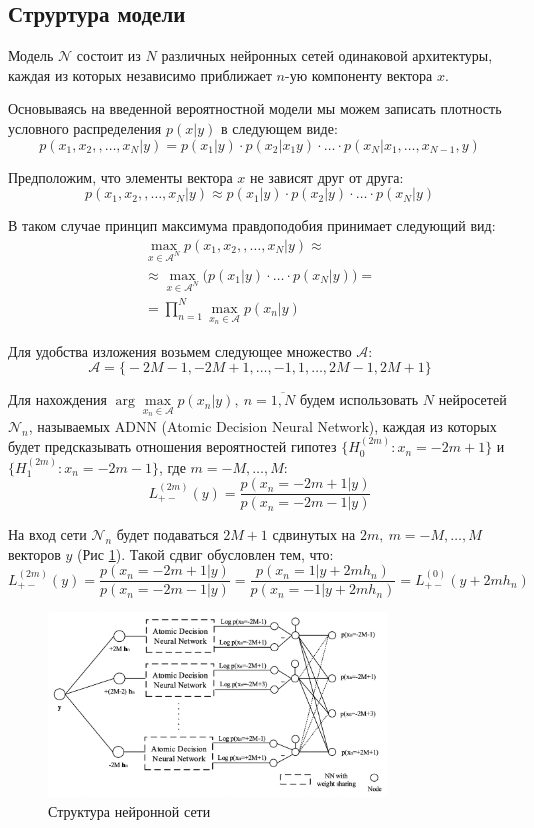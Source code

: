 \documentclass[12pt]{article}
\begin{document}
\subsection{Струртура модели}
Модель $\mathcal{N}$ состоит из $N$ различных нейронных сетей одинаковой архитектуры, каждая из которых независимо приближает $n$-ую компоненту вектора $x$.

Основываясь на введенной вероятностной модели мы можем записать плотность условного распределения $p(x | y)$ в следующем виде:
    $$
    p(x_1, x_2, , \ldots, x_N | y) = p(x_1 | y) \cdot p(x_2 | x_1 y) \cdot \ldots \cdot p(x_N | x_1,  \ldots, x_{N-1},  y)
    $$

Предположим, что элементы вектора $x$ не зависят друг от друга:
    $$
    p(x_1, x_2, , \ldots, x_N | y) \approx p(x_1 | y) \cdot p(x_2 | y) \cdot \ldots \cdot p(x_N | y)
    $$

В таком случае принцип максимума правдоподобия принимает следующий вид:
    $$
    \begin{gathered}
    \max_{x \in \mathcal{A}^N} p(x_1, x_2, , \ldots, x_N | y) \approx \\
    \approx \max_{x \in \mathcal{A}^N} \big( p(x_1 | y) \cdot \ldots \cdot p(x_N | y) \big) = \\ 
    = \prod_{n=1}^N \max_{x_n \in \mathcal{A}} p(x_n | y)
    \end{gathered}
    $$

Для удобства изложения возьмем следующее множество $\mathcal{A}$:
    $$
    \mathcal{A} = \big\{ -2M - 1, -2M + 1, \dots, -1, 1, \dots, 2M - 1, 2M + 1 \big\}
    $$

Для нахождения $\arg \max\limits_{x_n \in \mathcal{A}} p(x_n | y), \ n = \overline{1, N}$ будем использовать $N$ нейросетей $\mathcal{N}_n$, называемых ADNN (Atomic Decision Neural Network), каждая из которых будет предсказывать отношения вероятностей гипотез $\{ H_0^{(2m)} : x_n = -2m + 1 \}$ и $\{ H_1^{(2m)} : x_n = -2m - 1 \}$, где $m = -M, \ldots, M$:
    $$
    L_{+-}^{(2m)}(y) = \frac{p(x_n = -2m + 1 | y)}{p(x_n = -2m - 1 | y)}
    $$

На вход сети $\mathcal{N}_n$ будет подаваться $2M+1$ сдвинутых на $2m, \ m = -M, \ldots, M$ векторов $y$ (Рис \ref{ADNN}). Такой сдвиг обусловлен тем, что:
    $$
    L_{+-}^{(2m)}(y) = \frac{p(x_n = -2m + 1 | y)}{p(x_n = -2m - 1 | y)} = \frac{p(x_n = 1 | y + 2m h_n)}{p(x_n = -1 | y + 2m h_n)}=  L_{+-}^{(0)}(y + 2m h_n)
    $$

\begin{figure}
    \centering
    \includegraphics[width=0.8\textwidth]{ADNN.png}
    \caption{Структура нейронной сети}
    \label{ADNN}
\end{figure}
\end{document}
